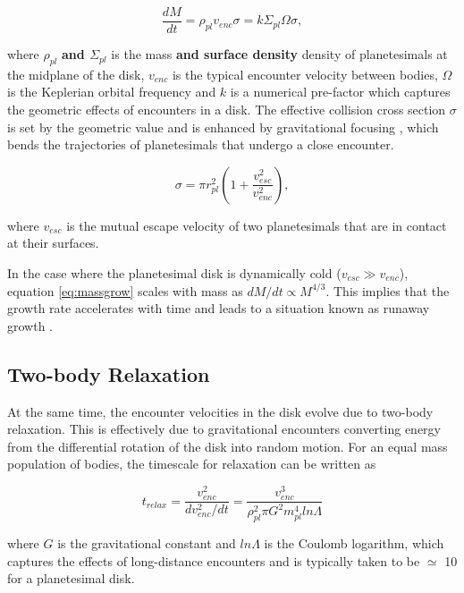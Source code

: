 \begin{equation}\label{eq:massgrow}
	\frac{dM}{dt} = \rho_{pl} v_{enc} \sigma = k \Sigma_{pl} \Omega \sigma,
\end{equation}

\noindent where $\rho_{pl}$ \textbf{and $\Sigma_{pl}$} is the mass \textbf{and surface density} density of planetesimals at the midplane of the disk, $v_{enc}$ is the typical encounter velocity between bodies, $\Omega$ is the Keplerian orbital frequency and $k$ is a numerical pre-factor which captures the geometric effects of encounters in a disk. The effective collision cross section $\sigma$ is set by the geometric value and is enhanced by gravitational focusing \cite{safronov69}, which bends the trajectories of planetesimals that undergo a close encounter.

\begin{equation}\label{eq:gf}
	\sigma = \pi r_{pl}^2 \left( 1 + \frac{v_{esc}^2}{v_{enc}^2} \right),
\end{equation}

\noindent where $v_{esc}$ is the mutual escape velocity of two planetesimals that are in contact at their surfaces.

In the case where the planetesimal disk is dynamically cold ($v_{esc} \gg v_{enc}$), equation \ref{eq:massgrow} scales with mass as $dM/dt \propto M^{4/3}$. This implies that the growth rate accelerates with time and leads to a situation known as runaway growth \cite{wetherill89, kokubo96}.

\subsection{Two-body Relaxation}

At the same time, the encounter velocities in the disk evolve due to two-body relaxation. This is effectively due to gravitational encounters converting energy from the differential rotation of the disk into random motion. For an equal mass population of bodies, the timescale for relaxation can be written as 

\begin{equation}\label{eq:relax}
	t_{relax} = \frac{v_{enc}^2}{d v_{enc}^2 / dt} = \frac{v_{enc}^3}{\rho_{pl}^2 \pi G^{2} m_{pl}^4 ln \Lambda}
\end{equation}

\noindent where $G$ is the gravitational constant and $ln \Lambda$ is the Coulomb logarithm, which captures the effects of long-distance encounters and is typically taken to be $\simeq$ 10 for a planetesimal disk.

